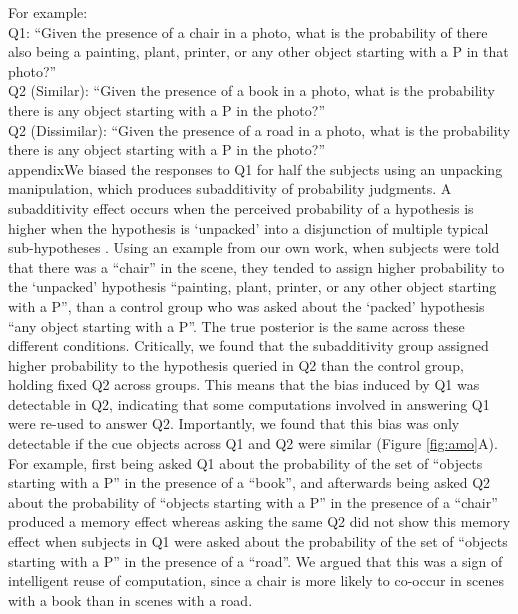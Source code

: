 For example: \\
Q1: ``Given the presence of a chair in a photo, what is the probability of there also being a painting, plant, printer, or any other object starting with a P in that photo?''\\
Q2 (Similar): ``Given the presence of a book in a photo, what is the probability there is any object starting with a P in the photo?''\\
Q2 (Dissimilar): ``Given the presence of a road in a photo, what is the probability there is any object starting with a P in the photo?''\\

appendixWe biased the responses to Q1 for half the subjects using an unpacking manipulation, which produces subadditivity of probability judgments. A subadditivity effect occurs when the perceived probability of a hypothesis is higher when the hypothesis is `unpacked' into a disjunction of multiple typical sub-hypotheses \citep{fox1998belief,tversky1994support,dasgupta2017hypotheses}. Using an example from our own work, when subjects were told that there was a ``chair'' in the scene, they tended to assign higher probability to the `unpacked' hypothesis ``painting, plant, printer, or any other object starting with a P'', than a control group who was asked about the `packed' hypothesis ``any object starting with a P''. The true posterior is the same across these different conditions. Critically, we found that the subadditivity group assigned higher probability to the hypothesis queried in Q2 than the control group, holding fixed Q2 across groups. This means that the bias induced by Q1 was detectable in Q2, indicating that some computations involved in answering Q1 were re-used to answer Q2. Importantly, we found that this bias was only detectable if the cue objects across Q1 and Q2 were similar (Figure \ref{fig:amo}A). 
For example, first being asked Q1 about the probability of the set of ``objects starting with a P'' in the presence of a ``book'', and afterwards being asked Q2 about the probability of ``objects starting with a P'' in the presence of a ``chair'' produced a memory effect whereas asking the same Q2 did not show this memory effect when subjects in Q1 were asked about the probability of the set of ``objects starting with a P'' in the presence of a ``road''. We argued that this was a sign of intelligent reuse of computation, since a chair is more likely to co-occur in scenes with a book than in scenes with a road.

